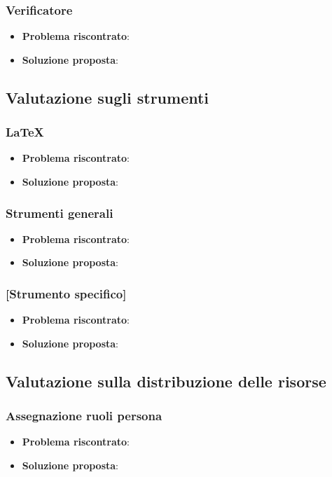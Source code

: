 		\subsubsection{Verificatore}
			\begin{itemize}
				\item \textbf{Problema riscontrato}:
				\item \textbf{Soluzione proposta}:
			\end{itemize}

	\subsection{Valutazione sugli strumenti}

		\subsubsection{\LaTeX}
			\begin{itemize}
				\item \textbf{Problema riscontrato}:
				\item \textbf{Soluzione proposta}:
			\end{itemize}
		
		\subsubsection{Strumenti generali}
			\begin{itemize}
				\item \textbf{Problema riscontrato}:
				\item \textbf{Soluzione proposta}:
			\end{itemize}
		
		\subsubsection{[Strumento specifico]}	
			\begin{itemize}
				\item \textbf{Problema riscontrato}:
				\item \textbf{Soluzione proposta}:
			\end{itemize}
		
	\subsection{Valutazione sulla distribuzione delle risorse}
	
		\subsubsection{Assegnazione ruoli persona}
			\begin{itemize}
				\item \textbf{Problema riscontrato}:
				\item \textbf{Soluzione proposta}:
			\end{itemize}
		
